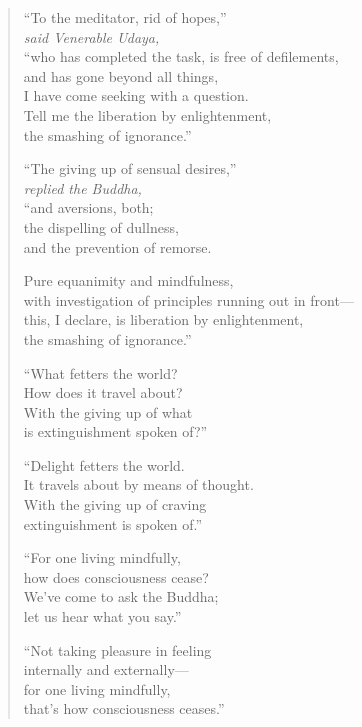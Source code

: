 \documentclass[12pt,openany]{book}%
\newcommand*{\scspeaker}[1]{\hspace{2em}\textit{#1}}
\begin{document}
\begin{verse}%
“To the meditator, rid of hopes,” \\
\scspeaker{said Venerable Udaya, }\\
“who has completed the task, is free of defilements, \\
and has gone beyond all things, \\
I have come seeking with a question. \\
Tell me the liberation by enlightenment, \\
the smashing of ignorance.” 

“The giving up of sensual desires,” \\
\scspeaker{replied the Buddha, }\\
“and aversions, both; \\
the dispelling of dullness, \\
and the prevention of remorse. 

Pure equanimity and mindfulness, \\
with investigation of principles running out in front—\\
this, I declare, is liberation by enlightenment, \\
the smashing of ignorance.” 

“What fetters the world? \\
How does it travel about? \\
With the giving up of what \\
is extinguishment spoken of?” 

“Delight fetters the world. \\
It travels about by means of thought. \\
With the giving up of craving \\
extinguishment is spoken of.” 

“For one living mindfully, \\
how does consciousness cease? \\
We’ve come to ask the Buddha; \\
let us hear what you say.” 

“Not taking pleasure in feeling \\
internally and externally—\\
for one living mindfully, \\
that’s how consciousness ceases.” 

%
\end{verse}
\end{document}
